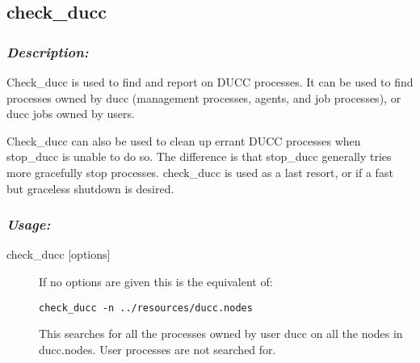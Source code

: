           


\subsection{check\_ducc}
\label{subsec:admin.check-ducc}
    \subsubsection{{\em Description:}}

    Check\_ducc is used to find and report on DUCC processes. It can be used to find processes 
    owned by ducc (management processes, agents, and job processes), or ducc jobs owned by 
    users. 
    
    Check\_ducc can also be used to clean up errant DUCC processes when stop\_ducc is unable 
    to do so. The difference is that stop\_ducc generally tries more gracefully stop processes. 
    check\_ducc is used as a last resort, or if a fast but graceless shutdown is desired. 
    
    \subsubsection{\em{Usage: }}

        \begin{description} 
          \item[check\_ducc {[options]}]
              If no options are given this is the equivalent of: 
\begin{verbatim}
check_ducc -n ../resources/ducc.nodes 
\end{verbatim}
              
              This searches for all the processes owned by user ducc on all the nodes in ducc.nodes. User 
              processes are not searched for. 
        \end{description}
            
